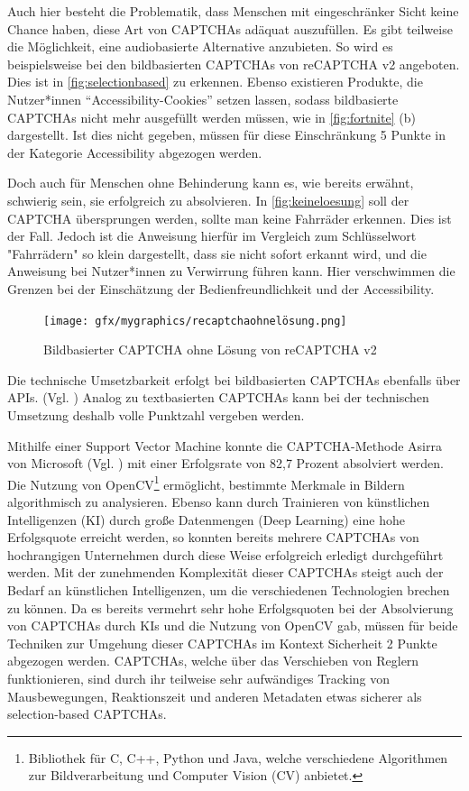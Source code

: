 Auch hier besteht die Problematik, dass Menschen mit eingeschränker Sicht keine Chance haben, diese Art von CAPTCHAs adäquat auszufüllen.
Es gibt teilweise die Möglichkeit, eine audiobasierte Alternative anzubieten. 
So wird es beispielsweise bei den bildbasierten CAPTCHAs von reCAPTCHA v2 angeboten. 
Dies ist in \autoref{fig:selectionbased} zu erkennen.
Ebenso existieren Produkte, die Nutzer*innen ``Accessibility-Cookies'' setzen lassen, 
sodass bildbasierte CAPTCHAs nicht mehr ausgefüllt werden müssen, wie in \autoref{fig:fortnite} (b) dargestellt.
Ist dies nicht gegeben, müssen für diese Einschränkung 5 Punkte in der Kategorie Accessibility abgezogen werden.

Doch auch für Menschen ohne Behinderung kann es, wie bereits erwähnt, schwierig sein, sie erfolgreich zu absolvieren.
In \autoref{fig:keineloesung} soll der CAPTCHA übersprungen werden, sollte man keine Fahrräder erkennen.
Dies ist der Fall. 
Jedoch ist die Anweisung hierfür im Vergleich zum Schlüsselwort "Fahrrädern" so klein dargestellt, dass sie nicht sofort erkannt wird,
und die Anweisung bei Nutzer*innen zu Verwirrung führen kann.
Hier verschwimmen die Grenzen bei der Einschätzung der Bedienfreundlichkeit und der Accessibility.

\begin{figure}[h!]
    \centering
    \texttt{[image: gfx/mygraphics/recaptchaohnelösung.png]}
    \caption{Bildbasierter CAPTCHA ohne Lösung von reCAPTCHA v2}   
    \label{fig:keineloesung}
\end{figure}

\pagebreak

Die technische Umsetzbarkeit erfolgt bei bildbasierten CAPTCHAs ebenfalls über APIs. (Vgl. \cite{hcaptcha} \cite{arkoselabs} \cite{geetest})
Analog zu textbasierten CAPTCHAs kann bei der technischen Umsetzung deshalb volle Punktzahl vergeben werden.

Mithilfe einer Support Vector Machine konnte die CAPTCHA-Methode Asirra von Microsoft (Vgl. \cite{elson2007asirra})
mit einer Erfolgsrate von 82,7 Prozent absolviert werden. 
Die Nutzung von OpenCV\footnote[4]{Bibliothek für C, C++, Python und Java, welche verschiedene Algorithmen zur Bildverarbeitung und Computer Vision (CV) anbietet.}
ermöglicht, bestimmte Merkmale in Bildern algorithmisch zu analysieren.
Ebenso kann durch Trainieren von künstlichen Intelligenzen (KI) durch große Datenmengen (Deep Learning) eine hohe Erfolgsquote erreicht werden,
so konnten bereits mehrere CAPTCHAs von hochrangigen Unternehmen durch diese Weise erfolgreich erledigt durchgeführt werden.
Mit der zunehmenden Komplexität dieser CAPTCHAs steigt auch der Bedarf an künstlichen Intelligenzen, um die verschiedenen Technologien brechen zu können.
Da es bereits vermehrt sehr hohe Erfolgsquoten bei der Absolvierung von CAPTCHAs durch KIs und die Nutzung von OpenCV gab,
müssen für beide Techniken zur Umgehung dieser CAPTCHAs im Kontext Sicherheit 2 Punkte abgezogen werden.
CAPTCHAs, welche über das Verschieben von Reglern funktionieren, sind durch ihr teilweise sehr aufwändiges Tracking von Mausbewegungen,
Reaktionszeit und anderen Metadaten etwas sicherer als selection-based CAPTCHAs. \cite[p.77f]{surveyofresearch}

